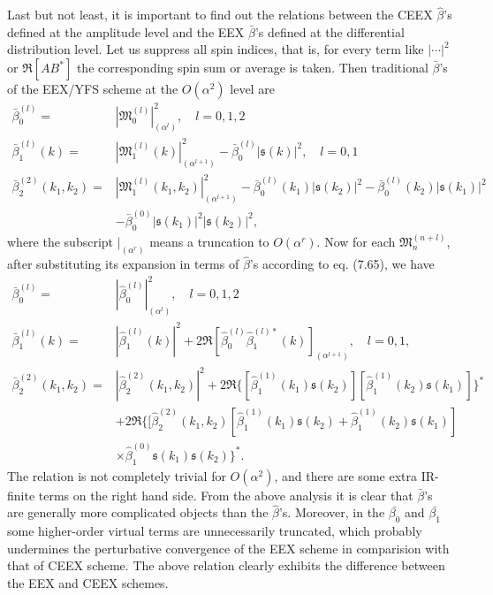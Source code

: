 Last but not least, it is important to find out the relations between the CEEX $\hat{\beta}$'s defined at the amplitude level and the EEX $\bar{\beta}$'s defined at the differential distribution level. Let us suppress all spin indices, that is, for every term like $|\cdots|^2$ or $\Re[AB^\ast]$ the corresponding spin sum or average is taken. Then traditional $\bar{\beta}$'s of the EEX/YFS scheme at the $O(\alpha^2)$ level are
\begin{align}
\bar{\beta}^{(l)}_0=&\left|\mathfrak{M}^{(l)}_0\right|^2_{(\alpha^l)},\quad l=0,1,2\nonumber\\
\bar{\beta}^{(l)}_1(k)=&\left|\mathfrak{M}^{(l)}_1(k)\right|^2_{(\alpha^{l+1})}-\bar{\beta}^{(l)}_0\left|\mathfrak{s}(k)\right|^2,\quad l=0,1\nonumber\\
\bar{\beta}^{(2)}_2(k_1,k_2)=&\left|\mathfrak{M}^{(l)}_1(k_1,k_2)\right|^2_{(\alpha^{l+1})}-\bar{\beta}^{(l)}_0(k_1)\left|\mathfrak{s}(k_2)\right|^2-\bar{\beta}^{(l)}_0(k_2)\left|\mathfrak{s}(k_1)\right|^2\nonumber\\
&-\bar{\beta}^{(0)}_0\left|\mathfrak{s}(k_1)\right|^2\left|\mathfrak{s}(k_2)\right|^2,
\end{align}
where the subscript $|_{(\alpha^r)}$ means a truncation to $O(\alpha^r)$. Now for each $\mathfrak{M}^{(n+l)}_n$, after substituting its expansion in terms of $\hat{\beta}$'s according to eq. (7.65), we have
\begin{align}
\bar{\beta}^{(l)}_0=&\left|\hat{\beta}^{(l)}_0\right|^2_{(\alpha^l)},\quad l=0,1,2\nonumber\\
\bar{\beta}^{(l)}_1(k)=&\left|\hat{\beta}^{(l)}_1(k)\right|^2+2\Re[\hat{\beta}^{(l)}_0\hat{\beta}^{(l)\ast}_1(k)]_{(\alpha^{l+1})},\quad l=0,1,\nonumber\\
\bar{\beta}^{(2)}_2(k_1,k_2)=&\left|\hat{\beta}^{(2)}_2(k_1,k_2)\right|^2+2\Re\{[\hat{\beta}^{(1)}_1(k_1)\mathfrak{s}(k_2)][\hat{\beta}^{(1)}_1(k_2)\mathfrak{s}(k_1)]\}^\ast\nonumber\\
&+2\Re\{[\hat{\beta}^{(2)}_2(k_1,k_2)[\hat{\beta}_1^{(1)}(k_1)\mathfrak{s}(k_2)+\hat{\beta}_1^{(1)}(k_2)\mathfrak{s}(k_1)]\nonumber\\
&\times\hat{\beta}^{(0)}_1\mathfrak{s}(k_1)\mathfrak{s}(k_2)\}^\ast.
\end{align}
The relation is not completely trivial for $O(\alpha^2)$, and there are some extra IR-finite terms on the right hand side. From the above analysis it is clear that $\bar{\beta}$'s are generally more complicated objects than the $\hat{\beta}$'s. Moreover, in the $\bar{\beta_{0}}$ and $\bar{\beta_{1}}$ some higher-order virtual terms are unnecessarily truncated, which probably undermines the perturbative convergence of the EEX scheme in comparision with that of CEEX scheme. The above relation clearly exhibits the difference between the EEX and CEEX schemes. 

